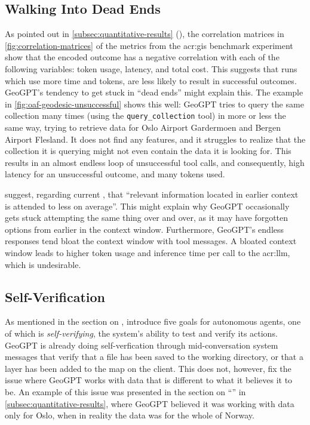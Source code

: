 \subsection[Walking Into Dead Ends]{Walking Into Dead Ends}
\label{subsec:dead-ends}

As pointed out in \autoref{subsec:quantitative-results} (), the correlation matrices in \autoref{fig:correlation-matrices} of the metrics from the \acrshort{acr:gis} benchmark experiment show that the encoded outcome has a negative correlation with each of the following variables: token usage, latency, and total cost. This suggests that runs which use more time and tokens, are less likely to result in successful outcomes. GeoGPT's tendency to get stuck in \enquote{dead ends} might explain this. The example in \autoref{fig:oaf-geodesic-unsuccessful} shows this well: GeoGPT tries to query the same collection many times (using the \texttt{query\_collection} tool) in more or less the same way, trying to retrieve data for Oslo Airport Gardermoen and Bergen Airport Flesland. It does not find any features, and it struggles to realize that the collection it is querying might not even contain the data it is looking for. This results in an almost endless loop of unsuccessful tool calls, and consequently, high latency for an unsuccessful outcome, and many tokens used.

\cite{peysakhovichAttentionSortingCombats2023} suggest, regarding current , that \enquote{relevant information located in earlier context is attended to less on average}. This might explain why GeoGPT occasionally gets stuck attempting the same thing over and over, as it may have forgotten options from earlier in the context window. Furthermore, GeoGPT's endless responses tend bloat the context window with tool messages. A bloated context window leads to higher token usage and inference time per call to the \acrshort{acr:llm}, which is undesirable.


\subsection{Self-Verification}
\label{subsec:self-verification}

As mentioned in the section on , \cite{liAutonomousGISNextgeneration2023} introduce five goals for autonomous agents, one of which is \textit{self-verifying}, the system's ability to test and verify its actions. GeoGPT is already doing self-verfication through mid-conversation system messages that verify that a file has been saved to the working directory, or that a layer has been added to the map on the client. This does not, however, fix the issue where GeoGPT works with data that is different to what it believes it to be. An example of this issue was presented in the section on \enquote{} in \autoref{subsec:quantitative-results}, where GeoGPT believed it was working with data only for Oslo, when in reality the data was for the whole of Norway.

